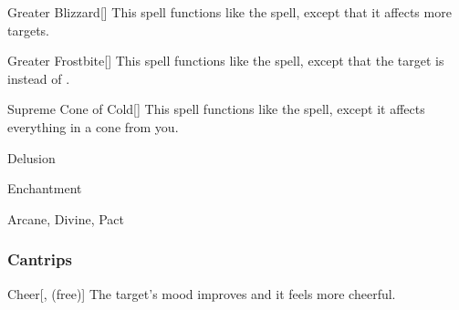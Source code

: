 \lowercase{\hypertarget{spell:Greater Blizzard}{}}\label{spell:Greater Blizzard}
\begin{freeability}[Rank 6]{\hypertarget{spell:Greater Blizzard}{Greater Blizzard}}[]
This spell functions like the  spell, except that it affects more targets.
\end{freeability}
\vspace{0.25em}



\lowercase{\hypertarget{spell:Greater Frostbite}{}}\label{spell:Greater Frostbite}
\begin{freeability}[Rank 6]{\hypertarget{spell:Greater Frostbite}{Greater Frostbite}}[]
This spell functions like the  spell, except that the target is  instead of .
\end{freeability}
\vspace{0.25em}



\lowercase{\hypertarget{spell:Supreme Cone of Cold}{}}\label{spell:Supreme Cone of Cold}
\begin{freeability}[Rank 6]{\hypertarget{spell:Supreme Cone of Cold}{Supreme Cone of Cold}}[]
This spell functions like the  spell, except it affects everything in a \areahuge cone from you.
\end{freeability}
\vspace{0.25em}


\newpage
\begin{spellsection}{Delusion}

\begin{spellheader}
\end{spellheader}


 Enchantment

 Arcane, Divine, Pact

\subsubsection{Cantrips}


\begin{freeability}{Cheer}[,  (free)]
The target's mood improves and it feels more cheerful.
\end{freeability}

\end{spellsection}


